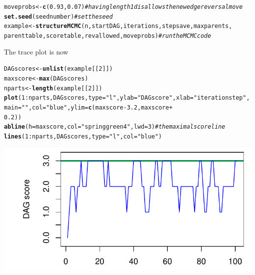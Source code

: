 \documentclass[a4paper]{article}\usepackage[]{graphicx}\usepackage[]{color}
\makeatletter
\def\maxwidth{ %
  \ifdim\Gin@nat@width>\linewidth
    \linewidth
  \else
    \Gin@nat@width
  \fi
}
\newcommand{\hlnum}[1]{\textcolor[rgb]{0.686,0.059,0.569}{#1}}%
\newcommand{\hlstr}[1]{\textcolor[rgb]{0.192,0.494,0.8}{#1}}%
\newcommand{\hlcom}[1]{\textcolor[rgb]{0.678,0.584,0.686}{\textit{#1}}}%
\newcommand{\hlopt}[1]{\textcolor[rgb]{0,0,0}{#1}}%
\newcommand{\hlstd}[1]{\textcolor[rgb]{0.345,0.345,0.345}{#1}}%
\newcommand{\hlkwb}[1]{\textcolor[rgb]{0.69,0.353,0.396}{#1}}%
\newcommand{\hlkwc}[1]{\textcolor[rgb]{0.333,0.667,0.333}{#1}}%
\newcommand{\hlkwd}[1]{\textcolor[rgb]{0.737,0.353,0.396}{\textbf{#1}}}%
\newenvironment{kframe}{%
 \def\at@end@of@kframe{}%
 \ifinner\ifhmode%
  \def\at@end@of@kframe{\end{minipage}}%
  \begin{minipage}{\columnwidth}%
 \fi\fi%
 \def\FrameCommand##1{\hskip\@totalleftmargin \hskip-\fboxsep
 \colorbox{shadecolor}{##1}\hskip-\fboxsep
     \hskip-\linewidth \hskip-\@totalleftmargin \hskip\columnwidth}%
 \MakeFramed {\advance\hsize-\width
   \@totalleftmargin\z@ \linewidth\hsize
   \@setminipage}}%
 {\par\unskip\endMakeFramed%
 \at@end@of@kframe}
\newenvironment{knitrout}{}{} %
\newcommand{\nn}{\noindent}
\makeatother
\begin{document}
\begin{knitrout}
\color{fgcolor}\begin{kframe}
\begin{alltt}
\hlstd{moveprobs} \hlkwb{<-} \hlkwd{c}\hlstd{(}\hlnum{0.93}\hlstd{,} \hlnum{0.07}\hlstd{)}  \hlcom{# having length 1 disallows the new edge reversal move}
\hlkwd{set.seed}\hlstd{(seednumber)}  \hlcom{# set the seed}
\hlstd{example} \hlkwb{<-} \hlkwd{structureMCMC}\hlstd{(n, startDAG, iterations, stepsave, maxparents,}
    \hlstd{parenttable, scoretable, revallowed, moveprobs)}  \hlcom{# run the MCMC code}
\end{alltt}
\end{kframe}
\end{knitrout}

\nn The trace plot is now

\begin{knitrout}
\color{fgcolor}\begin{kframe}
\begin{alltt}
\hlstd{DAGscores} \hlkwb{<-} \hlkwd{unlist}\hlstd{(example[[}\hlnum{2}\hlstd{]])}
\hlstd{maxscore} \hlkwb{<-} \hlkwd{max}\hlstd{(DAGscores)}
\hlstd{nparts} \hlkwb{<-} \hlkwd{length}\hlstd{(example[[}\hlnum{2}\hlstd{]])}
\hlkwd{plot}\hlstd{(}\hlnum{1}\hlopt{:}\hlstd{nparts, DAGscores,} \hlkwc{type} \hlstd{=} \hlstr{"l"}\hlstd{,} \hlkwc{ylab} \hlstd{=} \hlstr{"DAG score"}\hlstd{,} \hlkwc{xlab} \hlstd{=} \hlstr{"iteration step"}\hlstd{,}
    \hlkwc{main} \hlstd{=} \hlstr{""}\hlstd{,} \hlkwc{col} \hlstd{=} \hlstr{"blue"}\hlstd{,} \hlkwc{ylim} \hlstd{=} \hlkwd{c}\hlstd{(maxscore} \hlopt{-} \hlnum{3.2}\hlstd{, maxscore} \hlopt{+}
        \hlnum{0.2}\hlstd{))}
\hlkwd{abline}\hlstd{(}\hlkwc{h} \hlstd{= maxscore,} \hlkwc{col} \hlstd{=} \hlstr{"springgreen4"}\hlstd{,} \hlkwc{lwd} \hlstd{=} \hlnum{3}\hlstd{)}  \hlcom{# the maximal score line}
\hlkwd{lines}\hlstd{(}\hlnum{1}\hlopt{:}\hlstd{nparts, DAGscores,} \hlkwc{type} \hlstd{=} \hlstr{"l"}\hlstd{,} \hlkwc{col} \hlstd{=} \hlstr{"blue"}\hlstd{)}
\end{alltt}
\end{kframe}

{\centering \includegraphics[width=\maxwidth]{figure/minimal-unnamed-chunk-13-1} 

}



\end{knitrout}
\end{document}

